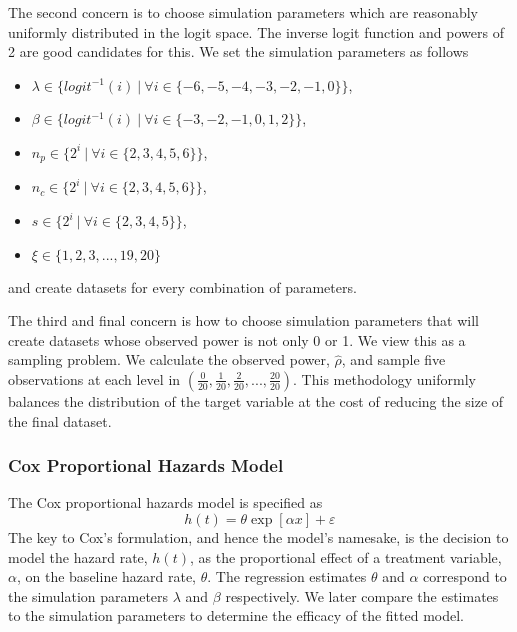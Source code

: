 The second concern is to choose simulation parameters which are reasonably uniformly distributed in the logit space. The inverse logit function and powers of 2 are good candidates for this. We set the simulation parameters as follows 
%
\begin{itemize}
    \item $\lambda \in \lbrace logit^{-1}(i) ~|~ \forall i \in \lbrace -6, -5, -4, -3, -2, -1, 0 \rbrace \rbrace$,
    \item $\beta \in \lbrace logit^{-1}(i) ~|~ \forall i \in \lbrace -3, -2, -1, 0, 1, 2 \rbrace \rbrace$,
    \item $n_p \in \lbrace 2^i ~|~ \forall i \in \lbrace 2, 3, 4, 5, 6 \rbrace \rbrace$, 
    \item $n_c \in \lbrace 2^i ~|~ \forall i \in \lbrace 2, 3, 4, 5, 6 \rbrace \rbrace$, 
    \item $s \in \lbrace 2^i ~|~ \forall i \in \lbrace 2, 3, 4, 5 \rbrace \rbrace$,
    \item $\xi \in \lbrace 1, 2, 3, ..., 19, 20 \rbrace$
\end{itemize}
%
and create datasets for every combination of parameters.

The third and final concern is how to choose simulation parameters that will create datasets whose observed power is not only 0 or 1. We view this as a sampling problem. We calculate the observed power, $\hat \rho$, and sample five observations at each level in $(\frac{0}{20}, \frac{1}{20}, \frac{2}{20}, ..., \frac{20}{20})$. This methodology uniformly balances the distribution of the target variable at the cost of reducing the size of the final dataset.

\subsubsection{Cox Proportional Hazards Model}

The Cox proportional hazards model is specified as 
%
\begin{equation}
\label{eq:cox}
    h(t) = \theta \exp \left[ \alpha x \right] + \varepsilon
\end{equation}
%
The key to Cox's formulation, and hence the model's namesake, is the decision to model the hazard rate, $h(t)$, as the proportional effect of a treatment variable, $\alpha$, on the baseline hazard rate, $\theta$. The regression estimates $\theta$ and $\alpha$ correspond to the simulation parameters $\lambda$ and $\beta$ respectively. We later compare the estimates to the simulation parameters to determine the efficacy of the fitted model.

